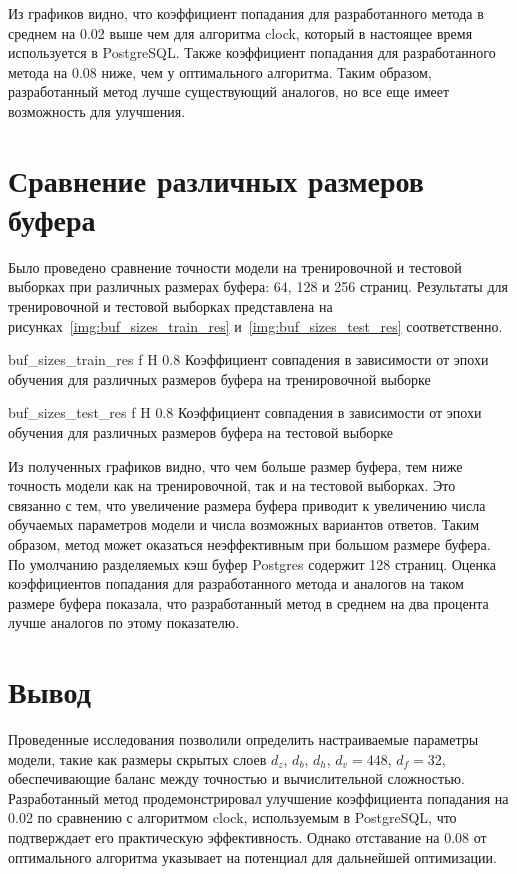 Из графиков видно, что коэффициент попадания для разработанного метода в среднем на 0.02 выше чем для алгоритма clock, который в настоящее время используется в PostgreSQL.
Также коэффициент попадания для разработанного метода на 0.08 ниже, чем у оптимального алгоритма.
Таким образом, разработанный метод лучше существующий аналогов, но все еще имеет возможность для улучшения.

\section{Сравнение различных размеров буфера}

Было проведено сравнение точности модели на тренировочной и тестовой выборках при различных размерах буфера: 64, 128 и 256 страниц.
Результаты для тренировочной и тестовой выборках представлена на рисунках~\ref{img:buf_sizes_train_res} и~\ref{img:buf_sizes_test_res} соответственно.

{buf_sizes_train_res} %
{f} %
{H} %
{0.8\textwidth} %
{Коэффициент совпадения в зависимости от эпохи обучения для различных размеров буфера на тренировочной выборке} %

{buf_sizes_test_res} %
{f} %
{H} %
{0.8\textwidth} %
{Коэффициент совпадения в зависимости от эпохи обучения для различных размеров буфера на тестовой выборке} %

Из полученных графиков видно, что чем больше размер буфера, тем ниже точность модели как на тренировочной, так и на тестовой выборках.
Это связанно с тем, что увеличение размера буфера приводит к увеличению числа обучаемых параметров модели и числа возможных вариантов ответов.
Таким образом, метод может оказаться неэффективным при большом размере буфера.
По умолчанию разделяемых кэш буфер Postgres содержит 128 страниц.
Оценка коэффициентов попадания для разработанного метода и аналогов на таком размере буфера показала, что разработанный метод в среднем на два процента лучше аналогов по этому показателю.

\section{Вывод}
Проведенные исследования позволили определить настраиваемые параметры модели, такие как размеры скрытых слоев $d_z$, $d_b$, $d_h$, $d_v = 448$, $d_f = 32$, обеспечивающие баланс между точностью и вычислительной сложностью. 
Разработанный метод продемонстрировал улучшение коэффициента попадания на 0.02 по сравнению с алгоритмом clock, используемым в PostgreSQL, что подтверждает его практическую эффективность. 
Однако отставание на 0.08 от оптимального алгоритма указывает на потенциал для дальнейшей оптимизации.

